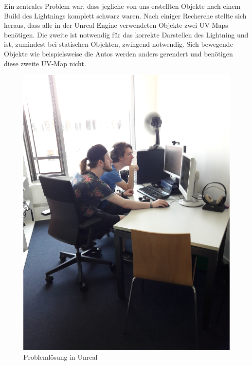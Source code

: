 \documentclass{Bericht}
\begin{document}
			
			

			Ein zentrales Problem war, dass jegliche von uns erstellten Objekte nach einem Build des Lightnings komplett schwarz waren. Nach einiger Recherche stellte sich heraus, dass alle in der Unreal Engine verwendeten Objekte zwei UV-Maps benötigen. Die zweite ist notwendig für das korrekte Darstellen des Lightning und ist, zumindest bei statischen Objekten, zwingend notwendig. Sich bewegende Objekte wie beispielsweise die Autos werden anders gerendert und benötigen diese zweite UV-Map nicht. 
		
		
				
				
				
				
				
	

			

			
		\begin{figure}[!htbp] %
			\centering
			\includegraphics[trim = 200mm 0mm 600mm 0mm, clip, height=\linewidth, width=\textheight, keepaspectratio, angle=270]{../Bilder/20170619_102101.jpg} %
			\caption{Problemlösung in Unreal}
			\label{img:porblemloesung}
		\end{figure}
		
\end{document}
